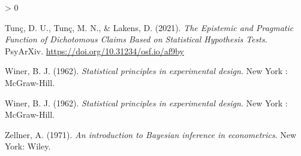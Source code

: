 \documentclass[
  english,
  ,jou, a4paper,floatsintext]{apa6}
\newlength{\cslhangindent}
\newenvironment{CSLReferences}[2] %
 {%
  \setlength{\parindent}{0pt}
  \ifodd #1 \everypar{\setlength{\hangindent}{\cslhangindent}}\ignorespaces\fi
  \ifnum #2 > 0
  \setlength{\parskip}{#2\baselineskip}
  \fi
 }%
 {}
\begin{document}
\begin{CSLReferences}{1}{0}
\leavevmode\hypertarget{ref-tunc_epistemic_2021}{}%
Tunç, D. U., Tunç, M. N., \& Lakens, D. (2021). \emph{The {Epistemic} and {Pragmatic} {Function} of {Dichotomous} {Claims} {Based} on {Statistical} {Hypothesis} {Tests}}. PsyArXiv. \url{https://doi.org/10.31234/osf.io/af9by}

\leavevmode\hypertarget{ref-winer_statistical_1962}{}%
Winer, B. J. (1962). \emph{Statistical principles in experimental design}. {New York : McGraw-Hill}.

\leavevmode\hypertarget{ref-winer_statistical_1962}{}%
Winer, B. J. (1962). \emph{Statistical principles in experimental design}. {New York : McGraw-Hill}.

\leavevmode\hypertarget{ref-zellner_introduction_1971}{}%
Zellner, A. (1971). \emph{An introduction to {Bayesian} inference in econometrics}. {New York}: {Wiley}.

\end{CSLReferences}

\endgroup
\end{document}

